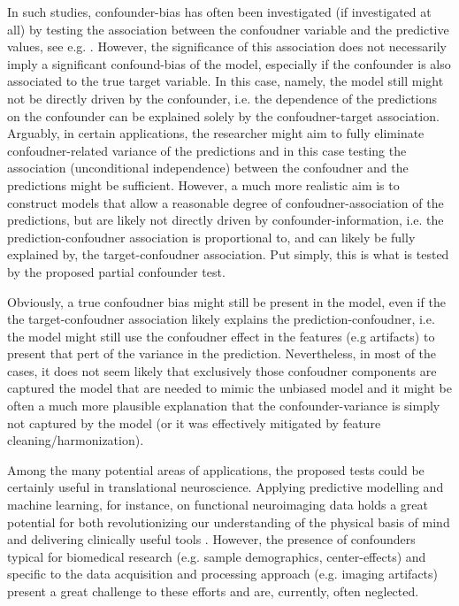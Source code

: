\documentclass{article}
\begin{document}
In such studies, confounder-bias has often been investigated (if investigated at all) by testing the association between the confoudner variable and the predictive values, see e.g. \citep{spisak2020pain}.
However, the significance of this association does not necessarily imply a significant confound-bias of the model, especially if the confounder is also associated to the true target variable. In this case, namely, the model still might not be directly driven by the confounder, i.e. the dependence of the predictions on the confounder can be explained solely by the confoudner-target association. 
Arguably, in certain applications, the researcher might aim to fully eliminate confoudner-related variance of the predictions and in this case testing the association (unconditional independence) between the confoudner and the predictions might be sufficient. However, a much more realistic aim is to construct models that allow a reasonable degree of confoudner-association of the predictions, but are likely not directly driven by confounder-information, i.e. the prediction-confoudner association is proportional to, and can likely be fully explained by, the target-confoudner association.
Put simply, this is what is tested by the proposed partial confounder test.

Obviously, a true confoudner bias might still be present in the model, even if the the target-confoudner association likely explains the prediction-confoudner, i.e. the model might still use the confoudner effect in the features (e.g artifacts) to present that pert of the variance in the prediction. Nevertheless, in most of the cases, it does not seem likely that exclusively those confoudner components are captured the model that are needed to mimic the unbiased model and it might be often a much more plausible explanation that the confounder-variance is simply not captured by the model (or it was effectively mitigated by feature cleaning/harmonization).

Among the many potential areas of applications, the proposed tests could be certainly useful in translational neuroscience. Applying predictive modelling and machine learning, for instance, on functional neuroimaging data holds a great potential for both revolutionizing our understanding of the physical basis of mind and delivering clinically useful tools \citep{woo2017building, wager2013fmri, spisak2020pain}. However, the presence of confounders typical for biomedical research (e.g. sample demographics, center-effects) and specific to the data acquisition and processing approach (e.g. imaging artifacts) present a great challenge to these efforts and are, currently, often neglected.
\end{document}
